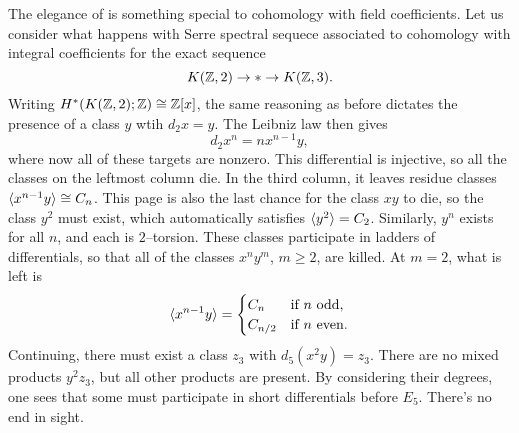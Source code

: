 \begin{example}
The elegance of  is something special to cohomology with field coefficients.
Let us consider what happens with Serre spectral sequece associated to cohomology with integral coefficients for the exact sequence \[K(\mathbb Z, 2) \to * \to K(\mathbb Z, 3).\]
Writing $H^*(K(\mathbb Z, 2); \mathbb Z) \cong \mathbb Z[x]$, the same reasoning as before dictates the presence of a class $y$ wtih $d_2 x = y$.
The Leibniz law then gives \[d_2 x^n = n x^{n-1} y,\] where now all of these targets are nonzero.
This differential is injective, so all the classes on the leftmost column die.
In the third column, it leaves residue classes $\langle x^{n-1} y\rangle \cong C_n$.
This page is also the last chance for the class $xy$ to die, so the class $y^2$ must exist, which automatically satisfies $\langle y^2\rangle = C_2$.
Similarly, $y^n$ exists for all $n$, and each is $2$--torsion.
These classes participate in ladders of differentials, so that all of the classes $x^n y^m$, $m \ge 2$, are killed.
At $m = 2$, what is left is \[\langle x^{n-1} y\rangle = \begin{cases} C_n & \text{if $n$ odd}, \\ C_{n/2} & \text{if $n$ even}.\end{cases}\]
Continuing, there must exist a class $z_3$ with $d_5(x^2 y) = z_3$.
There are no mixed products $y^2 z_3$, but all other products are present.
By considering their degrees, one sees that some must participate in short differentials before $E_5$.
There's no end in sight.
\end{example}

